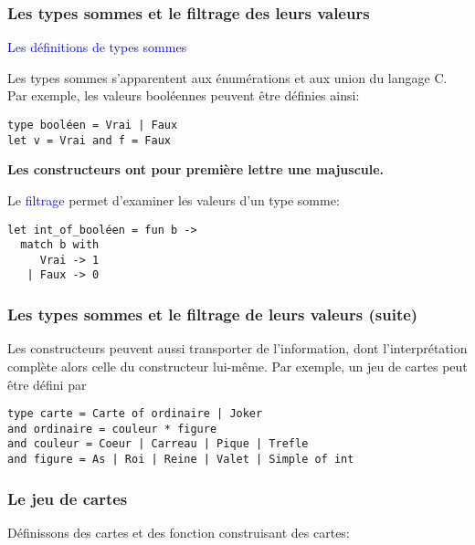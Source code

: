 %
\begin{frame}[containsverbatim]
\frametitle{Les types sommes et le filtrage des leurs valeurs}

\textcolor{blue}{Les définitions de types sommes}

\bigskip

Les types sommes s'apparentent aux énumérations et aux \textsf{union}
du langage C. Par exemple, les valeurs booléennes peuvent être
définies ainsi: {\small
\begin{verbatim}
type booléen = Vrai | Faux
let v = Vrai and f = Faux
\end{verbatim}
}
\textbf{Les constructeurs ont pour première lettre une majuscule.}

\bigskip

Le \textcolor{blue}{filtrage} permet d'examiner les valeurs d'un type
somme:
{\small
\begin{verbatim}
let int_of_booléen = fun b ->
  match b with
     Vrai -> 1 
   | Faux -> 0
\end{verbatim}
}

\end{frame}

%
\begin{frame}[containsverbatim]
\frametitle{Les types sommes et le filtrage de leurs valeurs (suite)}

Les constructeurs peuvent aussi transporter de l'information, dont
l'interprétation complète alors celle du constructeur lui-même. Par
exemple, un jeu de cartes peut être défini par
{\small
\begin{verbatim}
type carte = Carte of ordinaire | Joker
and ordinaire = couleur * figure
and couleur = Coeur | Carreau | Pique | Trefle
and figure = As | Roi | Reine | Valet | Simple of int
\end{verbatim}
}

\end{frame}

%
\begin{frame}
\frametitle{Le jeu de cartes}

Définissons des cartes et des fonction construisant des cartes:

\bigskip







\end{frame}

